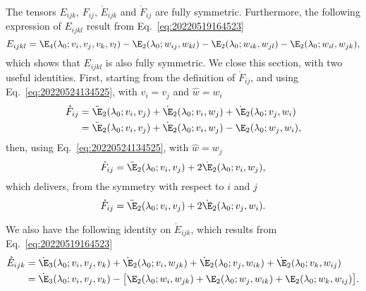 The tensors $E_{ijk}$, $F_{ij}$, $\mathring{E}_{ijk}$ and $\mathring{F}_{ij}$ are fully symmetric. Furthermore, the
following expression of $E_{ijkl}$ result from Eq.~\eqref{eq:20220519164523}
\begin{equation}
  \label{eq:20220802081116}
  E_{ijkl} = \E_4(\lambda_0 ; v_i, v_j, v_k, v_l) - \E_2(\lambda_0 ; w_{ij}, w_{kl}) - \E_2(\lambda_0 ; w_{ik}, w_{jl}) - \E_2(\lambda_0 ; w_{il}, w_{jk}),
\end{equation}
which shows that $E_{ijkl}$ is also fully symmetric. We close this section, with two useful identities. First, starting
from the definition of $\mathring{F}_{ij}$, and using Eq.~\eqref{eq:20220524134525}, with $v_i = v_j$ and
$\hat{w} = w_i$
\begin{equation}
  \label{eq:20220617084433}
  \begin{aligned}[b]
    \mathring{F}_{ij} ={} & \ddot{\E}_2(\lambda_0; v_i, v_j) + \dot{\E}_2(\lambda_0; v_i, w_j) + \dot{\E}_2(\lambda_0; v_j, w_i)\\
    ={} & \ddot{\E}_2(\lambda_0; v_i, v_j) + \dot{\E}_2(\lambda_0; v_i, w_j) - \E_2(\lambda_0; w_j, w_i),
  \end{aligned}
\end{equation}
then, using Eq.~\eqref{eq:20220524134525}, with $\hat{w} = w_j$
\begin{equation}
  \mathring{F}_{ij} = \ddot{\E}_2(\lambda_0; v_i, v_j)  + 2\dot{\E}_2(\lambda_0; v_i, w_j),
\end{equation}
which delivers, from the symmetry with respect to $i$ and $j$
\begin{equation}
  \mathring{F}_{ij} = \ddot{\E}_2(\lambda_0; v_i, v_j) + 2\dot{\E}_2(\lambda_0; v_j, w_i).
\end{equation}

We also have the following identity on $\mathring{E}_{ijk}$, which results from Eq.~\eqref{eq:20220519164523}
\begin{equation}
  \label{eq:20220617085256}
  \begin{aligned}[b]
  \mathring{E}_{ijk} ={}& \dot{\E}_3(\lambda_0; v_i, v_j, v_k) + \dot{\E}_2(\lambda_0; v_i, w_{jk}) + \dot{\E}_2(\lambda_0; v_j, w_{ik}) + \dot{\E}_2(\lambda_0; v_k, w_{ij})\\
  ={}& \dot{\E}_3(\lambda_0; v_i, v_j, v_k) - \bigl[\E_2(\lambda_0; w_i, w_{jk}) + \E_2(\lambda_0; w_j, w_{ik}) + \E_2(\lambda_0; w_k, w_{ij})\bigr].
  \end{aligned}
\end{equation}


